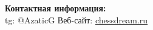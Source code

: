 \documentclass[a4paper,12pt]{article}
\begin{document}


\vspace{1cm}
\noindent\textbf{Контактная информация:} \\
tg: @AzaticG
Веб-сайт: \href{https://chessdream.ru}{chessdream.ru}
\end{document}

